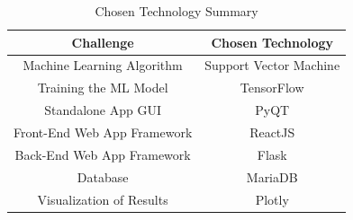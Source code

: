 \documentclass[12pt,journal,compsoc]{IEEEtran}
\begin{document}
\begin{table}[H]
\renewcommand{\arraystretch}{1.3}
\caption{Chosen Technology Summary}
\label{table_8}
\centering
\begin{tabular}{|c|c|}
\hline
Challenge & Chosen Technology\\
\hline
Machine Learning Algorithm & Support Vector Machine\\
\hline
Training the ML Model & TensorFlow\\
\hline
Standalone App GUI & PyQT\\
\hline
Front-End Web App Framework & ReactJS\\
\hline
Back-End Web App Framework & Flask\\
\hline
Database & MariaDB\\
\hline
Visualization of Results & Plotly\\
\hline
\end{tabular}
\end{table}

\ifCLASSOPTIONcaptionsoff
  \newpage
\fi

\newpage


\end{document}
